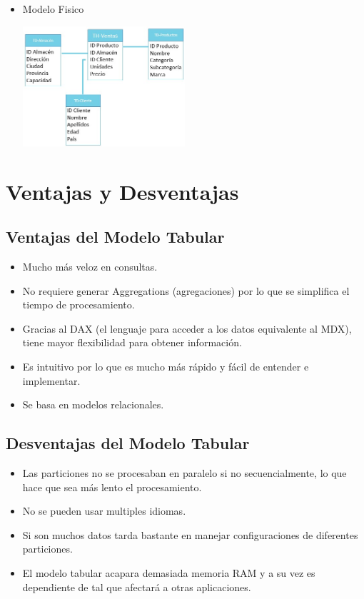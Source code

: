 \documentclass[preprint,12pt]{elsarticle}
\begin{document}
\begin{itemize}
	\item Modelo Fisico

\begin{center}
	\includegraphics[width=6cm]{./Imagenes/bran4} 
\end{center}

\end{itemize}


\section{Ventajas y Desventajas}

\subsection{Ventajas del Modelo Tabular}

\begin{itemize}
	\item Mucho más veloz en consultas.
	\item No requiere generar Aggregations (agregaciones) por lo que se simplifica el tiempo de procesamiento.
	\item Gracias al DAX (el lenguaje para acceder a los datos equivalente al MDX), tiene mayor flexibilidad para obtener información.
	\item Es intuitivo por lo que es mucho más rápido y fácil de entender e implementar.
	\item Se basa en modelos relacionales.
\end{itemize}

\subsection{Desventajas del Modelo Tabular}

\begin{itemize}
	\item Las particiones no se procesaban en paralelo si no secuencialmente, lo que hace que sea más lento el procesamiento.
	\item No se pueden usar multiples idiomas.
	\item Si son muchos datos tarda bastante en manejar configuraciones de diferentes particiones.
	\item El modelo tabular acapara demasiada memoria RAM y a su vez es dependiente de tal que afectará a otras aplicaciones.
\end{itemize}
\end{document}
